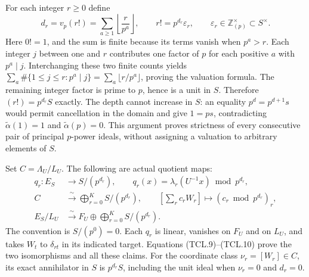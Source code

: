 For each integer \(r\geq0\) define
\[
 d_r=v_p(r!)=\sum_{a\geq1}\left\lfloor\frac{r}{p^a}\right\rfloor,
 \qquad r!=p^{d_r}\varepsilon_r,\qquad
 \varepsilon_r\in\mathbb Z_{(p)}^\times\subset S^\times.
 \tag{TCL.14}\label{CFStage:eq:tcl-depth}
\]
Here \(0!=1\), and the sum is finite because its terms vanish
when \(p^a>r\). Each integer \(j\) between one and \(r\)
contributes one factor of \(p\) for each positive \(a\) with
\(p^a\mid j\). Interchanging these two finite counts yields
\(\sum_a\#\{1\leq j\leq r:p^a\mid j\}
=\sum_a\lfloor r/p^a\rfloor\), proving the valuation formula.
The remaining integer factor is prime to \(p\), hence is a unit
in \(S\). Therefore \((r!)=p^{d_r}S\) exactly. The depth cannot
increase in \(S\): an equality \(p^d=p^{d+1}s\) would permit
cancellation in the domain and give \(1=ps\), contradicting
\(\widetilde\alpha(1)=1\) and \(\widetilde\alpha(p)=0\).
This argument proves strictness of every consecutive pair of
principal \(p\)-power ideals, without assigning a valuation to
arbitrary elements of \(S\).

Set \(C=\Lambda_U/L_U\). The following are actual quotient maps:
\[
 \begin{split}
 q_r:E_S&\longrightarrow S/(p^{d_r}),\qquad
 q_r(x)=\lambda_r(U^{-1}x)\bmod p^{d_r},\\
 C&\xrightarrow{\ \sim\ }\bigoplus_{r=0}^K S/(p^{d_r}),
       \qquad [\sum_r c_rW_r]\longmapsto
                       (c_r\bmod p^{d_r})_r,\\
 E_S/L_U&\xrightarrow{\ \sim\ }
                 F_U\oplus\bigoplus_{r=0}^K S/(p^{d_r}).
 \end{split}
 \tag{TCL.15}\label{CFStage:eq:tcl-quotient}
\]
The convention is \(S/(p^0)=0\). Each \(q_r\) is linear,
vanishes on \(F_U\) and on \(L_U\), and takes \(W_t\) to
\(\delta_{rt}\) in its indicated target. Equations
(TCL.9)--(TCL.10) prove the two isomorphisms and all these claims.
For the coordinate class \(\nu_r=[W_r]\in C\), its exact
annihilator in \(S\) is \(p^{d_r}S\), including the unit ideal
when \(\nu_r=0\) and \(d_r=0\).

